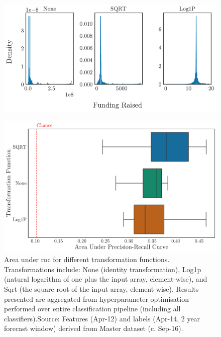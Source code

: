\documentclass[../thesis/thesis.tex]{subfiles}
\begin{document}
\begin{figure}[!htb]
    \centering
    \includegraphics[width=\textwidth]{../figures/design/funding_transformation}
    \caption[Funding raised feature transformed by functions]{}
    \label{fig:design:funding_transformation}
\end{figure}

\begin{figure}[!htb]
    \centering
    \includegraphics[width=\textwidth]{../figures/design/transformer}
    \caption[Area under PR Curves by transformation function]{Area under \gls{roc} for different transformation functions. Transformations include: None (identity transformation), Log1p (natural logarithm of one plus the input array, element-wise), and Sqrt (the square root of the input array, element-wise). Results presented are aggregated from hyperparameter optimisation performed over entire classification pipeline (including all classifiers).Source: Features (Apr-12) and labels (Apr-14, 2 year forecast window) derived from Master dataset (c. Sep-16).}
    \label{fig:design:transformer}
\end{figure}
\end{document}
